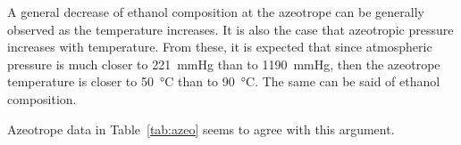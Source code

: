 A general decrease of ethanol composition at the azeotrope can be generally
observed as the temperature increases. It is also the case that azeotropic
pressure increases with temperature. From these, it is expected that since
atmospheric pressure is much closer to \SI{221}{\mmHg} than to \SI{1190}
{\mmHg}, then the azeotrope temperature is closer to \SI{50}{\celsius} than
to \SI{90}{\celsius}. The same can be said of ethanol composition.

Azeotrope data \cite[p.~331]{crc} in Table~\ref{tab:azeo} seems to agree 
with this argument.
